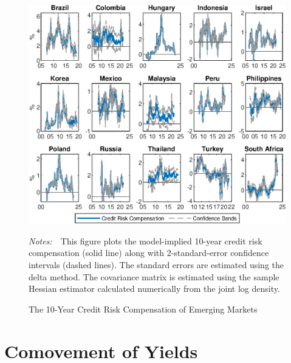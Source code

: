 \documentclass[a4paper, 12pt]{article}
\newcommand{\figtext}[1]{
	\vspace{-1ex}
	\captionsetup{justification=justified,font=footnotesize}
	\caption*{#1}
}
\newcommand{\fignotes}[1]{\figtext{\emph{Notes:~}~#1}}
\begin{document}
\begin{appendices}
\begin{landscape}
		\begin{figure}[tbph]
			\caption{The 10-Year Credit Risk Compensation of Emerging Markets} \label{fig:bsl_cr_CI_10y_V1}
			\begin{center}								%
				\begin{minipage}{0.9\linewidth}
					\begin{center}							%
						\includegraphics[trim={0cm 0cm 0cm 0cm},clip,height=0.8\textheight,width=\linewidth]{../Figures/bsl_cr_CI_10y_V1.eps} \\
					\end{center}
					\fignotes{This figure plots the model-implied 10-year credit risk compensation (solid line) along with 2-standard-error confidence intervals (dashed lines). The standard errors are estimated using the delta method. The covariance matrix is estimated using the sample Hessian estimator calculated numerically from the joint log density.}
				\end{minipage}
			\end{center}
		\end{figure}
	\end{landscape}
	
	
	\renewcommand\thefigure{\thesection.\arabic{figure}}
	\section{Comovement of Yields} \label{sec:comovement}
	\setcounter{figure}{0}
	

\end{appendices}
\end{document}
